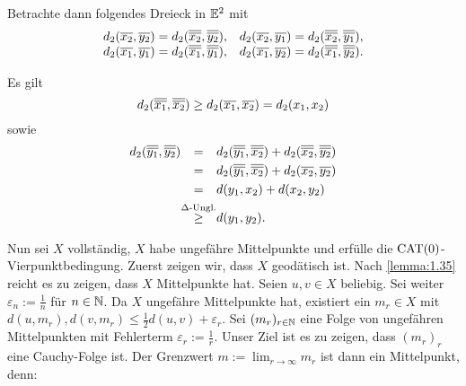 \begin{beweis}
\begin{description}
\begin{description}
		Betrachte dann folgendes Dreieck in $\mathbb{E}^2$ mit
		\[
			\begin{array}{cc}
				d_2(\overline{x_2},\overline{y_2}) = d_2(\overline{\overline{x_2}},\overline{\overline{y_2}}), &
				d_2(\overline{x_2},\overline{y_1}) = d_2(\overline{\overline{x_2}},\overline{\overline{y_1}}), \\
				d_2(\overline{x_1},\overline{y_1}) = d_2(\overline{\overline{x_1}},\overline{\overline{y_1}}), &
				d_2(\overline{x_1},\overline{y_2}) = d_2(\overline{\overline{x_1}},\overline{\overline{y_2}}).			
			\end{array}
		\]
		
		\begin{figure}[h]
			\centering
		\end{figure}
		
		Es gilt
		\[
			d_2(\overline{\overline{x_1}},\overline{\overline{x_2}}) \geq d_2(\overline{x_1},\overline{x_2}) = d_2(x_1,x_2)
		\]
		sowie
		\begin{align*}
			d_2(\ol{\ol{y_1}},\ol{\ol{y_2}}) &\stack{}{=} d_2(\ol{\ol{y_1}},\ol{\ol{x_2}}) + d_2(\ol{\ol{x_2}},\ol{\ol{y_2}}) \\
			&\stack{}{=} d_2(\ol{\ol{y_1}},\ol{\ol{x_2}}) + d_2(\ol{x_2},\ol{y_2}) \\
			&\stack{}{=} d(y_1,x_2) + d(x_2,y_2) \\
			&\stack{\Delta\text{-Ungl.}}{\geq} d(y_1,y_2).
		\end{align*}
	\end{description}
	\item[\bewrueck] Nun sei $X$ vollständig, $X$ habe ungefähre Mittelpunkte und erfülle die $\operatorname{CAT(0)}$-Vierpunktbedingung.
	Zuerst zeigen wir, dass $X$ geodätisch ist.
	Nach \autoref{lemma:1.35} reicht es zu zeigen, dass $X$ Mittelpunkte hat.
	Seien $u,v \in X$ beliebig.
	Sei weiter $\varepsilon_n := \frac{1}{n}$ für $n \in \mathbb{N}$.
	Da $X$ ungefähre Mittelpunkte hat, existiert ein $m_r \in X$ mit $d(u,m_r), d(v,m_r) \leq \frac{1}{2} d(u,v) + \varepsilon_r$.
	Sei $(m_r)_{r \in \mathbb{N}}$ eine Folge von ungefähren Mittelpunkten mit Fehlerterm $\varepsilon_r := \frac{1}{r}$.
	Unser Ziel ist es zu zeigen, dass $(m_r)_{r}$ eine Cauchy-Folge ist.
	Der Grenzwert $m := \lim_{r \rightarrow \infty} m_r$ ist dann ein Mittelpunkt, denn:
	\end{description}
\end{beweis}
\cleardoubleoddemptypage